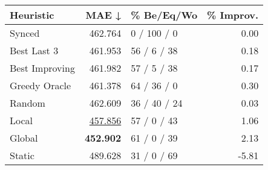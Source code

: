 \begin{tabular}{lrlr}
\toprule
\textbf{Heuristic} & \textbf{MAE ↓} & \textbf{\% Be/Eq/Wo} & \textbf{\% Improv.} \\
\midrule
            Synced &        462.764 &          0 / 100 / 0 &                0.00 \\
\midrule
       Best Last 3 &        461.953 &          56 / 6 / 38 &                0.18 \\
    Best Improving &        461.982 &          57 / 5 / 38 &                0.17 \\
\addlinespace
     Greedy Oracle &        461.378 &          64 / 36 / 0 &                0.30 \\
            Random &        462.609 &         36 / 40 / 24 &                0.03 \\
\midrule
             Local &        \underline{457.856} &          57 / 0 / 43 &                1.06 \\
            Global &        \textbf{452.902} &          61 / 0 / 39 &                2.13 \\
\midrule
            Static &        489.628 &          31 / 0 / 69 &               -5.81 \\
\bottomrule
\end{tabular}

\label{tab:iid_lr01_le1_bs2_Summary}
